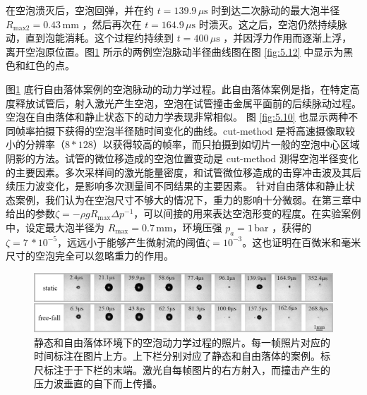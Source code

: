 在空泡溃灭后，空泡回弹，并在约 $t=139.9\,\mu \mathrm{s}$
时到达二次脉动的最大泡半径 $R_\textrm{max2}=0.43\,\mathrm{mm}$
，然后再次在 $t=164.9\,\mu \mathrm{s}$
时溃灭。这之后，空泡仍然持续脉动，直到泡能消耗。这个过程约持续到
$t=400\,\mu \mathrm{s}$ ，并因浮力作用而逐渐上浮，离开空泡原位置。图\ref{fig:5.9}
所示的两例空泡脉动半径曲线图在图 \ref{fig:5.12} 中显示为黑色和红色的点。

图\ref{fig:5.9} 
底行自由落体案例的空泡脉动的动力学过程。此自由落体案例是指，在特定高度释放试管后，射入激光产生空泡，空泡在试管撞击金属平面前的后续脉动过程。空泡在自由落体和静止状态下的动力学表现非常相似。
图 \ref{fig:5.10}
也显示两种不同帧率拍摄下获得的空泡半径随时间变化的曲线。cut-method
是将高速摄像取较小的分辨率（$8*128$）以获得较高的帧率，而只拍摄到如切片一般的空泡中心区域阴影的方法。试管的微位移造成的空泡位置变动是
cut-method
测得空泡半径变化的主要因素。多次采样间的激光能量密度，和试管微位移造成的击穿冲击波及其后续压力波变化，是影响多次测量间不同结果的主要因素。
针对自由落体和静止状态案例，我们认为在空泡尺寸不够大的情况下，重力的影响十分微弱。在第三章中给出的参数$\zeta=-\rho g R_{\text {max}} \Delta p^{-1}$，可以间接的用来表达空泡形变的程度。在实验案例中，设定最大泡半径为
$R_\textrm{max}=0.7\,$mm，环境压强 $p_a=1\,$bar ，获得的
$\zeta= 7\,*10^{-5}$，远远小于能够产生微射流的阈值$\zeta = 10^{-3}$。这也证明在百微米和毫米尺寸的空泡完全可以忽略重力的作用。

\begin{figure}[H]
  \centering
  \includegraphics[width=1\linewidth]{img/fig5.9.png}
  \caption[静态和自由落体环境下的空泡动力学过程的照片]{静态和自由落体环境下的空泡动力学过程的照片。每一帧照片对应的时间标注在图片上方。上下栏分别对应了静态和自由落体的案例。标尺标注于于下栏的末端。激光自每帧图片的右方射入，而撞击产生的压力波垂直的自下而上传播。
}
  \label{fig:5.9}
\end{figure}




